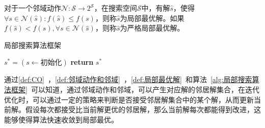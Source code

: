 \par
\begin{definition}
    \label{def:局部最优解}
    对于一个邻域动作$\mathcal{N}:\mathcal{S} \rightarrow 2^{\mathcal{S}}$，在搜索空间$\mathcal{S}$中，有解$\hat{s}$，使得$\forall s \in \mathcal{N}(\hat{s}) : f(\hat{s}) \leq f(s)$，则称$\hat{s}$为局部最优解。如果$f(\hat{s}) < f(s), \forall s \in \mathcal{N}(\hat{s})$，则称$\hat{s}$为严格局部最优解。
\end{definition}
\par
\begin{algorithm}
    \caption{局部搜索算法框架}
    \label{alg:局部搜索算法框架}
    \BlankLine
    $s^* = (s \leftarrow \text{初始化})$ \;
    \textbf{return } $s^*$ \;
\end{algorithm}
\par
通过\autoref{def:CO}~，\autoref{def:邻域动作和邻域}~，\autoref{def:局部最优解}~和算法~\ref{alg:局部搜索算法框架}~可以知道，通过邻域动作和邻域，可以产生对应解的邻居解集合，在迭代优化时，可以通过一定的策略来判断是否接受邻居解集合中的某个解，从而更新当前解。假设每次都接受比当前解更优的邻居解，那么当前解每次都能得到改进，这能够使得算法快速收敛到局部最优。

